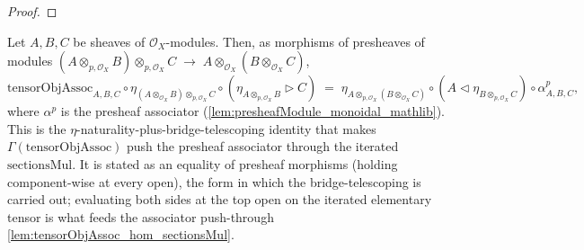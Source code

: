 \begin{proof}\leanok\end{proof}

\begin{lemma}\leanok
  \label{lem:tensorObjAssoc_eta_factor}
  Let \(A, B, C\) be sheaves of \(\mathcal{O}_X\)-modules. Then, as morphisms of
  presheaves of modules
  \((A \otimes_{p,\mathcal{O}_X} B) \otimes_{p,\mathcal{O}_X} C
    \;\longrightarrow\; A \otimes_{\mathcal{O}_X} (B \otimes_{\mathcal{O}_X} C)\),
  \[
    \mathrm{tensorObjAssoc}_{A,B,C}
      \circ \eta_{(A \otimes_{\mathcal{O}_X} B) \otimes_{p,\mathcal{O}_X} C}
      \circ (\eta_{A \otimes_{p,\mathcal{O}_X} B} \rhd C)
    \;=\;
    \eta_{A \otimes_{p,\mathcal{O}_X} (B \otimes_{\mathcal{O}_X} C)}
      \circ (A \lhd \eta_{B \otimes_{p,\mathcal{O}_X} C})
      \circ \alpha^{p}_{A,B,C},
  \]
  where \(\alpha^{p}\) is the presheaf associator
  (\cref{lem:presheafModule_monoidal_mathlib}). This is the
  \(\eta\)-naturality-plus-bridge-telescoping identity that makes
  \(\Gamma(\mathrm{tensorObjAssoc})\) push the presheaf associator through the
  iterated \(\mathrm{sectionsMul}\). It is stated as an equality of presheaf
  morphisms (holding component-wise at every open), the form in which the
  bridge-telescoping is carried out; evaluating both sides at the top open on the
  iterated elementary tensor is what feeds the associator push-through
  \cref{lem:tensorObjAssoc_hom_sectionsMul}.
\end{lemma}

